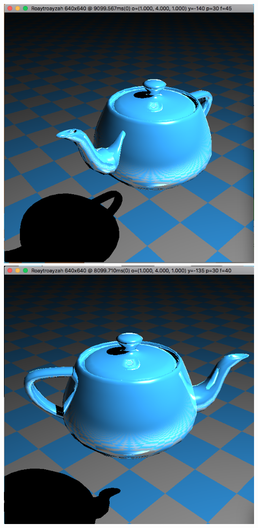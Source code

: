 \includegraphics[width=\textwidth]{img/smoothTeapot1}
\includegraphics[width=\textwidth]{img/smoothTeapot2}
